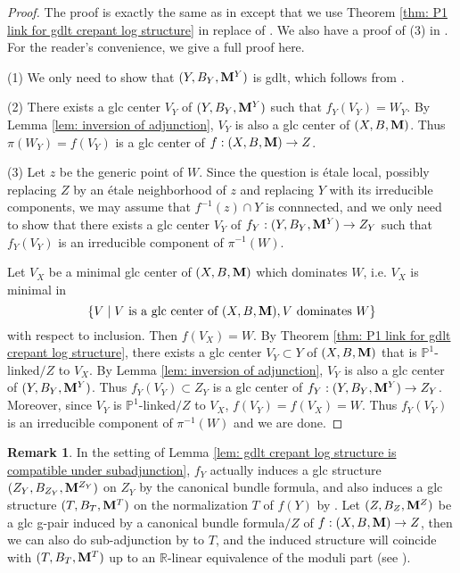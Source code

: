 \documentclass[11pt]{amsart}
\numberwithin{equation}{section}
\newcommand{\Mm}{{\bf{M}}}
\theoremstyle{definition}
\theoremstyle{definition}
\newtheorem{rem}[thm]{Remark}
\theoremstyle{definition}
\begin{document}
\begin{proof}
The proof is exactly the same as in \cite[Corollary 4.42]{Kol13} except that we use Theorem \ref{thm: P1 link for gdlt crepant log structure} in replace of \cite[Theorem 4.40]{Kol13}. We also have a proof of (3) in \cite[Proof of 4.1]{JLX22}. For the reader's convenience, we give a full proof here.

(1) We only need to show that $(Y,B_Y,\Mm^Y)$ is gdlt, which follows from \cite[Lemma 2.6]{HL22}. 

(2) There exists a glc center $V_Y$ of $(Y,B_Y,\Mm^Y)$ such that $f_Y(V_Y)=W_Y$. By Lemma \ref{lem: inversion of adjunction}, $V_Y$ is also a glc center of $(X,B,\Mm)$. Thus $\pi(W_Y)=f(V_Y)$ is a glc center of $f: (X,B,\Mm)\rightarrow Z$.

(3) Let $z$ be the generic point of $W$. Since the question is \'etale local, possibly replacing $Z$ by an \'etale neighborhood of $z$ and replacing $Y$ with its irreducible components, we may assume that $f^{-1}(z)\cap Y$ is connnected, and we only need to show that there exists a glc center $V_Y$ of $f_Y: (Y,B_Y,\Mm^Y)\rightarrow Z_Y$ such that $f_Y(V_Y)$ is an irreducible component of $\pi^{-1}(W)$.

Let $V_X$ be a minimal glc center of $(X,B,\Mm)$ which dominates $W$, i.e. $V_X$ is minimal in
$$\{V\mid V\text{ is a glc center of }(X,B,\Mm), V\text{ dominates }W\}$$
with respect to inclusion. Then $f(V_X)=W$. By Theorem \ref{thm: P1 link for gdlt crepant log structure}, there exists a glc center $V_Y\subset Y$ of $(X,B,\Mm)$ that is $\mathbb P^1$-linked$/Z$ to $V_X$. By Lemma \ref{lem: inversion of adjunction}, $V_Y$ is also a glc center of $(Y,B_Y,\Mm^Y)$. Thus $f_Y(V_Y)\subset Z_Y$ is a glc center of $f_Y: (Y,B_Y,\Mm^Y)\rightarrow Z_Y$. Moreover, since $V_Y$ is $\mathbb P^1$-linked$/Z$ to $V_X$, $f(V_Y)=f(V_X)=W$. Thus $f_Y(V_Y)$ is an irreducible component of $\pi^{-1}(W)$ and we are done.
\end{proof}

\begin{rem}
In the setting of Lemma \ref{lem: gdlt crepant log structure is compatible under subadjunction}, $f_Y$ actually induces a glc structure $(Z_Y,B_{Z_Y},\Mm^{Z_Y})$ on $Z_Y$ by the canonical bundle formula, and also induces a glc structure $(T,B_{T},\Mm^{T})$ on the normalization $T$ of $f(Y)$ by \cite[Theorem 1.2]{HL21b}. Let $(Z,B_Z,\Mm^Z)$ be a glc g-pair induced by a canonical bundle formula$/Z$ of $f: (X,B,\Mm)\rightarrow Z$, then we can also do sub-adjunction by \cite[Theorem 5.1]{HL21b} to $T$, and the induced structure will coincide with $(T, B_{T},\Mm^{T})$ up to an $\mathbb R$-linear equivalence of the moduli part (see \cite[Section 4]{JLX22}).
\end{rem}
\end{document}

